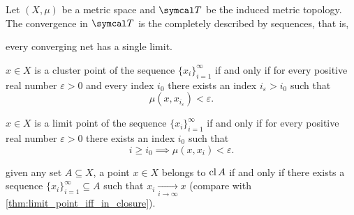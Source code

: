 \begin{proposition}\label{thm:metric_convergence_iff_metric_topology_convergence}
  Let \( (X, \mu) \) be a metric space and \( \Cal{T} \) be the induced metric topology. The convergence in \( \Cal{T} \) is the completely described by sequences, that is,

  \begin{defenum}
     every converging net has a single limit.

     \( x \in X \) is a cluster point of the sequence \( \{ x_i \}_{i=1}^\infty \) if and only if for every positive real number \( \varepsilon > 0 \) and every index \( i_0 \) there exists an index \( i_\varepsilon > i_0 \) such that
    \begin{equation*}
      \mu(x, x_{i_\varepsilon}) < \varepsilon.
    \end{equation*}

     \( x \in X \) is a limit point of the sequence \( \{ x_i \}_{i=1}^\infty \) if and only if for every positive real number \( \varepsilon > 0 \) there exists an index \( i_0 \) such that
    \begin{equation*}
      i \geq i_0 \implies \mu(x, x_i) < \varepsilon.
    \end{equation*}

     given any set \( A \subseteq X \), a point \( x \in X \) belongs to \( \operatorname{cl}{A} \) if and only if there exists a sequence \( \{ x_i \}_{i=1}^\infty \subseteq A \) such that \( x_i \xrightarrow[i \to \infty]{} x \) (compare with \cref{thm:limit_point_iff_in_closure}).
  \end{defenum}
\end{proposition}
